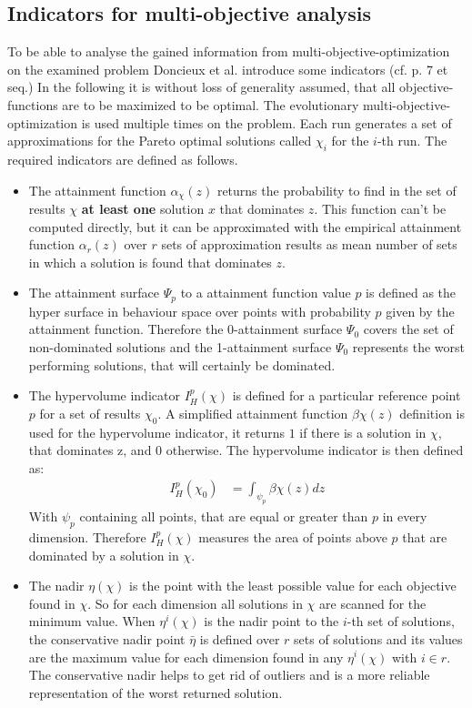 \documentclass[12pt,twoside]{article}
\theoremstyle{plain}
\theoremstyle{definition}
\theoremstyle{remark}
\begin{document}
\subsection{Indicators for multi-objective analysis}
\label{back:indicators}
To be able to analyse the gained information from multi-objective-optimization on the examined problem Doncieux et al. introduce some indicators (cf. \cite{doncieux2015multi} p. 7 et seq.)
In the following it is without loss of generality assumed, that all objective-functions are to be maximized to be optimal.
The evolutionary multi-objective-optimization is used multiple times on the problem. Each run generates a set of approximations for the Pareto optimal solutions called $\chi_i$ for the $i$-th run.
The required indicators are defined as follows.
\begin{itemize}
	\item The attainment function $\alpha_\chi(z)$ returns the probability to find in the set of results $\chi$ \textbf{at least one} solution $x$ that dominates $z$. This function can't be computed directly, but it can be approximated with the empirical attainment function $\alpha_r(z)$ over $r$ sets of approximation results as mean number of sets in which a solution is found that dominates $z$.
	\item The attainment surface $\Psi_p$ to a attainment function value $p$ is defined as the hyper surface in behaviour space over points with probability $p$ given by the attainment function.
	Therefore the 0-attainment surface $\Psi_0$ covers the set of non-dominated solutions and the 1-attainment surface $\Psi_0$ represents the worst performing solutions, that will certainly be dominated.
	\item The hypervolume indicator $I^p_H(\chi)$ is defined for a particular reference point $p$ for a set of results $\chi_0$. A simplified attainment function $\beta\chi(z)$ definition is used for the hypervolume indicator, it returns $1$ if there is a solution in $\chi$, that dominates z, and $0$ otherwise. The hypervolume indicator is then defined as:
	\begin{align*}
		I^p_H(\chi_0) &= \int_{\psi_p}\beta\chi(z) dz
	\end{align*}
	With $\psi_p$ containing all points, that are equal or greater than $p$ in every dimension.
	Therefore $I^p_H(\chi)$ measures the area of points above $p$ that are dominated by a solution in $\chi$.
	\item The nadir $\eta(\chi)$ is the point with the least possible value for each objective found in $\chi$. So for each dimension all solutions in $\chi$ are scanned for the minimum value.
	When $\eta^i(\chi)$ is the nadir point to the $i$-th set of solutions, the conservative nadir point $\bar{\eta}$ is defined over $r$ sets of solutions and its values are the maximum value for each dimension found in any $\eta^i(\chi)$ with $i\in r$. The conservative nadir helps to get rid of outliers and is a more reliable representation of the \glqq worst\grqq{} returned solution.
\end{itemize}
\end{document}
